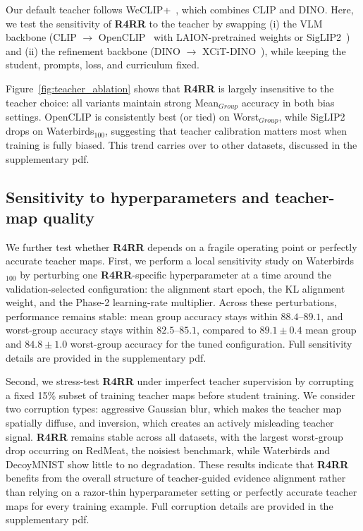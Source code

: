 Our default teacher follows WeCLIP+~\cite{zhang2024frozen}, which combines CLIP and DINO. Here, we test the sensitivity of \textbf{R4RR} to the teacher by swapping (i) the VLM backbone (CLIP $\rightarrow$ OpenCLIP~\cite{openclip} with LAION-pretrained weights or SigLIP2~\cite{siglip2}) and (ii) the refinement backbone (DINO $\rightarrow$ XCiT-DINO~\cite{el2021xcit, caron2021emerging}), while keeping the student, prompts, loss, and curriculum fixed.

Figure~\ref{fig:teacher_ablation} shows that \textbf{R4RR} is largely insensitive to the teacher choice: all variants maintain strong Mean$_{Group}$ accuracy in both bias settings. OpenCLIP is consistently best (or tied) on Worst$_{Group}$, while SigLIP2 drops on Waterbirds$_{100}$, suggesting that teacher calibration matters most when training is fully biased. This trend carries over to other datasets, discussed in the supplementary pdf.

\subsection{Sensitivity to hyperparameters and teacher-map quality}
\label{sec:sensitivity_stress}


We further test whether \textbf{R4RR} depends on a fragile operating point or perfectly accurate teacher maps. First, we perform a local sensitivity study on Waterbirds$_{100}$ by perturbing one \textbf{R4RR}-specific hyperparameter at a time around the validation-selected configuration: the alignment start epoch, the KL alignment weight, and the Phase-2 learning-rate multiplier. 
Across these perturbations, performance remains stable: mean group accuracy stays within $88.4$--$89.1$, and worst-group accuracy stays within $82.5$--$85.1$, compared to $89.1\pm0.4$ mean group and $84.8\pm1.0$ worst-group accuracy for the tuned configuration. Full sensitivity details are provided in the supplementary pdf. 

Second, we stress-test \textbf{R4RR} under imperfect teacher supervision by corrupting a fixed 15\% subset of training teacher maps before student training. We consider two corruption types: aggressive Gaussian blur, which makes the teacher map spatially diffuse, and inversion, which creates an actively misleading teacher signal. \textbf{R4RR} remains stable across all datasets, with the largest worst-group drop occurring on RedMeat, the noisiest benchmark, while Waterbirds and DecoyMNIST show little to no degradation. These results indicate that \textbf{R4RR} benefits from the overall structure of teacher-guided evidence alignment rather than relying on a razor-thin hyperparameter setting or perfectly accurate teacher maps for every training example. Full corruption details are provided in the supplementary pdf.


